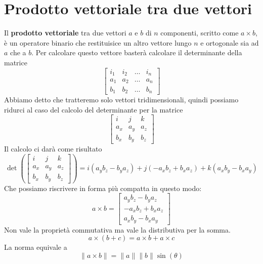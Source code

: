\section{Prodotto vettoriale tra due vettori}
Il \textbf{prodotto vettoriale} tra due vettori $a$ e $b$ di $n$ componenti, scritto come $a \times b$, \`e un operatore
binario che restituisice un altro vettore lungo $n$ e ortogonale sia ad $a$ che a $b$. Per calcolare questo vettore
baster\`a calcolare il determinante della matrice
\[
	\begin{bmatrix}
		i_1 & i_2 & \dots & i_n \\
		a_1 & a_2 & \dots & a_n \\
		b_1 & b_2 & \dots & b_n
	\end{bmatrix}
\]
Abbiamo detto che tratteremo solo vettori tridimensionali, quindi possiamo ridurci al caso del calcolo del determinante
per la matrice
\[
	\begin{bmatrix}
		i   & j   & k   \\
		a_x & a_y & a_z \\
		b_x & b_y & b_z
	\end{bmatrix}
\]
Il calcolo ci dar\`a come risultato
\[
	\det{
		\left(
		\begin{bmatrix}
			i   & j   & k   \\
			a_x & a_y & a_z \\
			b_x & b_y & b_z
		\end{bmatrix}
		\right)
	} = i(a_y b_z - b_y a_z) + j(-a_x b_z + b_x a_z) + k(a_x b_y - b_x a_y)
\]
Che possiamo riscrivere in forma pi\`u compatta in questo modo:
\[
	a \times b = \begin{bmatrix}
		a_y b_z - b_y a_z \\ -a_x b_z + b_x a_z \\ a_x b_y - b_x a_y
	\end{bmatrix}
\]
Non vale la propriet\`a commutativa ma vale la distributiva per la somma.
\[ a \times (b + c) = a \times b + a \times c \]
La norma equivale a
\[ \| a \times b \| = \| a \| \| b \| \sin(\theta) \]

